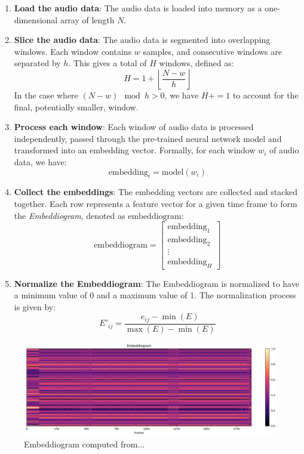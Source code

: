 \begin{enumerate}
\item \textbf{Load the audio data}: The audio data is loaded into memory as a one-dimensional array of length $N$.

\item \textbf{Slice the audio data}: The audio data is segmented into overlapping windows. Each window contains $w$ samples, and consecutive windows are separated by $h$. This gives a total of $H$ windows, defined as:
\begin{equation}
H = 1 + \left\lfloor \frac{N - w}{h} \right\rfloor
\end{equation}
In the case where $\left( N - w \right) \mod h > 0$, we have $H += 1$ to account for the final, potentially smaller, window.

\item \textbf{Process each window}: Each window of audio data is processed independently, passed through the pre-trained neural network model and transformed into an embedding vector. Formally, for each window $w_i$ of audio data, we have:
\begin{equation}
\text{embedding}_i = \text{model}(w_i)
\end{equation}

\item \textbf{Collect the embeddings}: The embedding vectors are collected and stacked together. Each row represents a feature vector for a given time frame to form the \textit{Embeddiogram}, denoted as $\text{embeddiogram}$:
\begin{equation}
\text{embeddiogram} = \begin{bmatrix} \text{embedding}_1 \\ \text{embedding}_2 \\ \vdots \\ \text{embedding}_H \end{bmatrix}
\end{equation}

\item \textbf{Normalize the Embeddiogram}: The Embeddiogram is normalized to have a minimum value of 0 and a maximum value of 1. The normalization process is given by:
\begin{equation}
E'_{ij} = \frac{e_{ij} - \min(E)}{\max(E) - \min(E)}
\end{equation}
\end{enumerate}

\begin{figure}
    \centering
    \includegraphics[width=\textwidth]{figures/images/embeddiogram_SALAMI_track_2.png}
    \caption[Embeddiogram]{Embeddiogram computed from...}
    \label{fig:embeddiogram}
\end{figure}


